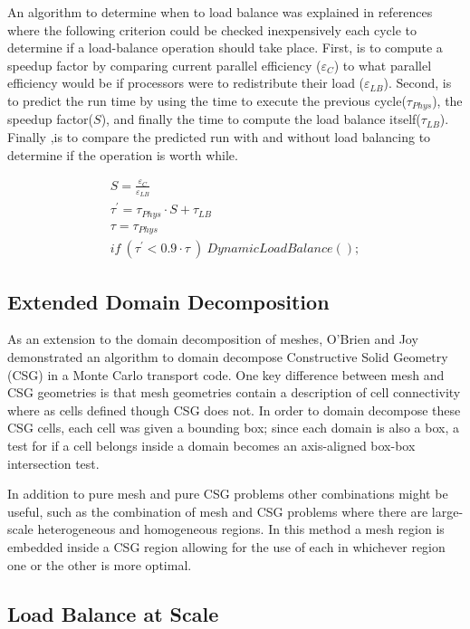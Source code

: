 An algorithm to determine when to load balance was explained in references~\cite{procassini2005load}~\cite{o2005dynamic} where the following criterion could be checked inexpensively each cycle to determine if a load-balance operation should take place.
%
First, is to compute a speedup factor by comparing current parallel efficiency ($ \varepsilon_C $) to what parallel efficiency would be if processors were to redistribute their load ($ \varepsilon_{LB} $).
%
Second, is to predict the run time by using the time to execute the previous cycle($ \tau_{Phys} $), the speedup factor($S$), and finally the time to compute the load balance itself($ \tau_{LB} $).
%
Finally ,is to compare the predicted run with and without load balancing to determine if the operation is worth while.~\cite{o2005dynamic}


\begin{eqnarray}
S = \frac{\varepsilon_C}{\varepsilon_{LB}} \\
\tau^{'} = \tau_{Phys} \cdot S + \tau_{LB} \\
\tau = \tau_{Phys} \\
if\ (\tau^{'} < 0.9 \cdot \tau \ )\ DynamicLoadBalance();
\end{eqnarray}

\subsection*{Extended Domain Decomposition}

As an extension to the domain decomposition of meshes, O'Brien and Joy demonstrated an algorithm to domain decompose Constructive Solid Geometry (CSG) in a Monte Carlo transport code.
%
One key difference between mesh and CSG geometries is that mesh geometries contain a description of cell connectivity where as cells defined though CSG does not.
%
In order to domain decompose these CSG cells, each cell was given a bounding box; since each domain is also a box, a test for if a cell belongs inside a domain becomes an axis-aligned box-box intersection test.~\cite{o2009domain}
%

In addition to pure mesh and pure CSG problems other combinations might be useful, such as the combination of mesh and CSG problems where there are large-scale heterogeneous and homogeneous regions.
%
In this method a mesh region is embedded inside a CSG region allowing for the use of each in whichever region one or the other is more optimal.
~\cite{greenman2009enhancements}

\subsection*{Load Balance at Scale}

